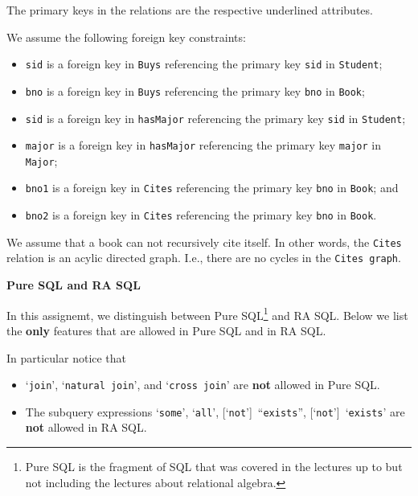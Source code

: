 \documentclass[11pt]{article}
\begin{document}
The primary keys in the relations are the respective underlined attributes.

We assume the following foreign key constraints:
\begin{itemize}
\item {\tt sid} is a foreign key in {\tt Buys} referencing the primary key {\tt sid} in {\tt Student};
\item {\tt bno} is a foreign key in {\tt Buys} referencing the primary key {\tt bno} in {\tt Book};
\item {\tt sid} is a foreign key in {\tt hasMajor} referencing the primary key {\tt sid} in {\tt Student};
\item {\tt major} is a foreign key in {\tt hasMajor} referencing the primary key {\tt major} in {\tt Major};
\item {\tt bno1} is a foreign key in {\tt Cites} referencing the primary key {\tt bno} in {\tt Book}; and
\item {\tt bno2} is a foreign key in {\tt Cites} referencing the primary key {\tt bno} in {\tt Book}.
\end{itemize}

We assume that a book can not recursively cite itself.   In other words, the {\tt Cites} relation is an acylic directed graph.   I.e., there are no cycles in the {\tt Cites graph}.
\newpage

\noindent
\large{\bf Pure SQL and RA SQL}

\bigskip
In this assignemt, we distinguish between Pure SQL\footnote{Pure SQL is the fragment of SQL that was covered in the lectures up to but not including the lectures about relational algebra.} and RA SQL.
Below we list the {\bf only} features that are allowed in Pure SQL and in RA SQL. 

In particular notice that 
\begin{itemize}
\item `{\tt join}', `{\tt natural~join}', and `{\tt cross~join}' are {\bf not} allowed in Pure SQL.
\item The subquery expressions `{\tt some}', `{\tt all}', [`{\tt not}']~``{\tt exists}'', [`{\tt not}']~`{\tt exists}' are {\bf not} allowed in RA SQL.
\end{itemize}
\end{document}
